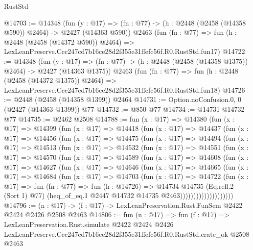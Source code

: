 \begin{lexlean}{RustStd}
\begin{coremodule}
@14703 := @14348
    (fun (y : @17) => (fn : @77) -> (h : @2448 (@2458 (@14358 @590)) @2464) -> @2427 (@14363 @590))
    @2463
    (fun (fn : @77) =>
    fun (h : @2448 (@2458 (@14372 @590)) @2464) =>
    LexLeanPreserve.Ccc247cd7b16ce28d2f355e31ffefc56f.R0.RustStd.fun17)
@14722 := @14348
    (fun (y : @17) =>
    (fn : @77) -> (h : @2448 (@2458 (@14358 @1375)) @2464) -> @2427 (@14363 @1375))
    @2463
    (fun (fn : @77) =>
    fun (h : @2448 (@2458 (@14372 @1375)) @2464) =>
    LexLeanPreserve.Ccc247cd7b16ce28d2f355e31ffefc56f.R0.RustStd.fun18)
@14726 := @2448 (@2458 (@14358 @1399)) @2464
@14731 := Option.noConfusion.{0, 0} (@2427 (@14363 @1399)) @77
@14732 := @850 @77
@14734 := @14731 @14732 @77
@14735 := @2462 @2508
@14788 := fun (x : @17) =>
  @14380
    (fun (x : @17) =>
    @14399
      (fun (x : @17) =>
      @14418
        (fun (x : @17) =>
        @14437
          (fun (x : @17) =>
          @14456
            (fun (x : @17) =>
            @14475
              (fun (x : @17) =>
              @14494
                (fun (x : @17) =>
                @14513
                  (fun (x : @17) =>
                  @14532
                    (fun (x : @17) =>
                    @14551
                      (fun (x : @17) =>
                      @14570
                        (fun (x : @17) =>
                        @14589
                          (fun (x : @17) =>
                          @14608
                            (fun (x : @17) =>
                            @14627
                              (fun (x : @17) =>
                              @14646
                                (fun (x : @17) =>
                                @14665
                                  (fun (x : @17) =>
                                  @14684
                                    (fun (x : @17) =>
                                    @14703
                                      (fun (x : @17) =>
                                      @14722
                                        (fun (x : @17) =>
                                        fun (fn : @77) =>
                                        fun (h : @14726) =>
                                        @14734
                                          @14735
                                          (Eq.refl.{2} (Sort 1) @77)
                                          (heq_of_eq.{1}
                                            @2447
                                            @14732
                                            @14735
                                            @2463))))))))))))))))))))
@14796 := (n : @17) -> (f : @17) -> LexLeanPreservation.Rust.FunSem @2422 @2424 @2426 @2508 @2463
@14806 := fun (n : @17) =>
  fun (f : @17) =>
  LexLeanPreservation.Rust.simulate
    @2422
    @2424
    @2426
    LexLeanPreserve.Ccc247cd7b16ce28d2f355e31ffefc56f.R0.RustStd.crate_ok
    @2508
    @2463
\end{coremodule}
\end{lexlean}

